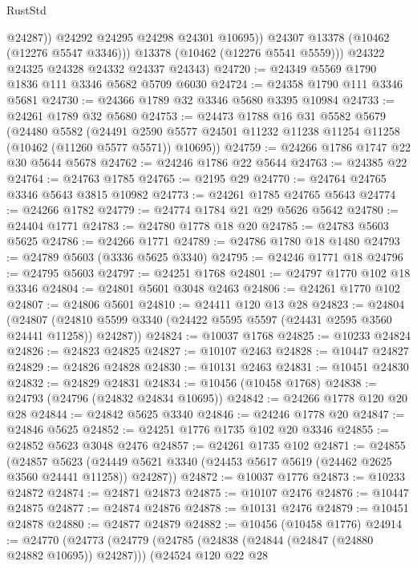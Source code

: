 \begin{lexlean}{RustStd}
\begin{coremodule}
                  @24287))
              @24292
              @24295
              @24298
              @24301
              @10695))
          @24307
          @13378
          (@10462 (@12276 @5547 @3346)))
        @13378
        (@10462 (@12276 @5541 @5559)))
      @24322
      @24325
      @24328
      @24332
      @24337
      @24343)
@24720 := @24349 @5569 @1790 @1836 @111 @3346 @5682 @5709 @6030
@24724 := @24358 @1790 @111 @3346 @5681
@24730 := @24366 @1789 @32 @3346 @5680 @3395 @10984
@24733 := @24261 @1789 @32 @5680
@24753 := @24473
    @1788
    @16
    @31
    @5582
    @5679
    (@24480
      @5582
      (@24491 @2590 @5577 @24501 @11232 @11238 @11254 @11258 (@10462 (@11260 @5577 @5571)) @10695))
@24759 := @24266 @1786 @1747 @22 @30 @5644 @5678
@24762 := @24246 @1786 @22 @5644
@24763 := @24385 @22
@24764 := @24763 @1785
@24765 := @2195 @29
@24770 := @24764 @24765 @3346 @5643 @3815 @10982
@24773 := @24261 @1785 @24765 @5643
@24774 := @24266 @1782
@24779 := @24774 @1784 @21 @29 @5626 @5642
@24780 := @24404 @1771
@24783 := @24780 @1778 @18 @20
@24785 := @24783 @5603 @5625
@24786 := @24266 @1771
@24789 := @24786 @1780 @18 @1480
@24793 := @24789 @5603 (@3336 @5625 @3340)
@24795 := @24246 @1771 @18
@24796 := @24795 @5603
@24797 := @24251 @1768
@24801 := @24797 @1770 @102 @18 @3346
@24804 := @24801 @5601 @3048 @2463
@24806 := @24261 @1770 @102
@24807 := @24806 @5601
@24810 := @24411 @120 @13 @28
@24823 := @24804
    (@24807 (@24810 @5599 @3340 (@24422 @5595 @5597 (@24431 @2595 @3560 @24441 @11258)) @24287))
@24824 := @10037 @1768
@24825 := @10233 @24824
@24826 := @24823 @24825
@24827 := @10107 @2463
@24828 := @10447 @24827
@24829 := @24826 @24828
@24830 := @10131 @2463
@24831 := @10451 @24830
@24832 := @24829 @24831
@24834 := @10456 (@10458 @1768)
@24838 := @24793 (@24796 (@24832 @24834 @10695))
@24842 := @24266 @1778 @120 @20 @28
@24844 := @24842 @5625 @3340
@24846 := @24246 @1778 @20
@24847 := @24846 @5625
@24852 := @24251 @1776 @1735 @102 @20 @3346
@24855 := @24852 @5623 @3048 @2476
@24857 := @24261 @1735 @102
@24871 := @24855
    (@24857
      @5623
      (@24449 @5621 @3340 (@24453 @5617 @5619 (@24462 @2625 @3560 @24441 @11258)) @24287))
@24872 := @10037 @1776
@24873 := @10233 @24872
@24874 := @24871 @24873
@24875 := @10107 @2476
@24876 := @10447 @24875
@24877 := @24874 @24876
@24878 := @10131 @2476
@24879 := @10451 @24878
@24880 := @24877 @24879
@24882 := @10456 (@10458 @1776)
@24914 := @24770
    (@24773
      (@24779
        (@24785 (@24838 (@24844 (@24847 (@24880 @24882 @10695)) @24287)))
        (@24524
          @120
          @22
          @28

\end{coremodule}
\end{lexlean}
